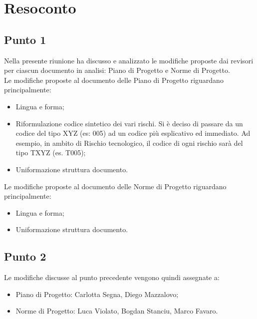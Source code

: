\section{Resoconto}

\subsection{Punto 1}
Nella presente riunione ha discusso e analizzato le modifiche proposte dai revisori per ciascun documento in analisi: Piano di Progetto e Norme di Progetto.\\
Le modifiche proposte al documento delle Piano di Progetto riguardano principalmente:
\begin{itemize}
	\item Lingua e forma;
	\item Riformulazione codice sintetico dei vari rischi. Si è deciso di passare da un codice del tipo XYZ (es: 005) ad un codice più esplicativo ed immediato. Ad esempio, in ambito di Rischio tecnologico, il codice di ogni rischio sarà del tipo TXYZ (es. T005);
	\item Uniformazione struttura documento.
\end{itemize}
Le modifiche proposte al documento delle Norme di Progetto riguardano principalmente:
\begin{itemize}
	\item Lingua e forma;
	\item Uniformazione struttura documento.
\end{itemize}

\subsection{Punto 2}
Le modifiche discusse al punto precedente vengono quindi assegnate a:
\begin{itemize}
	\item Piano di Progetto: Carlotta Segna, Diego Mazzalovo;
	\item Norme di Progetto: Luca Violato, Bogdan Stanciu, Marco Favaro.
\end{itemize}

